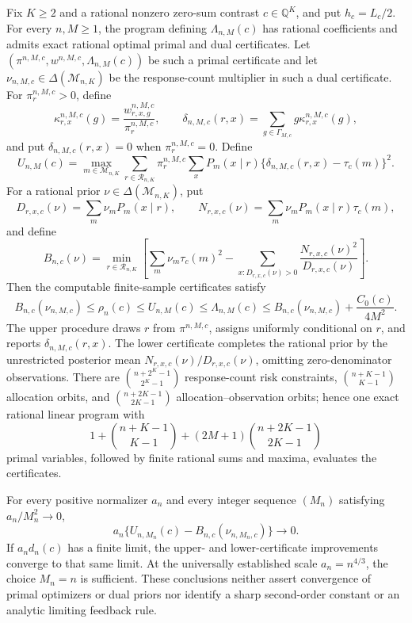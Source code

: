 Fix \(K\geq2\) and a rational nonzero zero-sum contrast \(c\in\mathbb Q^K\), and put \(h_c=L_c/2\).  For every \(n,M\geq1\), the program defining \(\Lambda_{n,M}(c)\) has rational coefficients and admits exact rational optimal primal and dual certificates.  Let \((\pi^{n,M,c},w^{n,M,c},\Lambda_{n,M}(c))\) be such a primal certificate and let \(\nu_{n,M,c}\in\Delta(\mathcal M_{n,K})\) be the response-count multiplier in such a dual certificate.  For \(\pi_r^{n,M,c}>0\), define
\[
 \kappa_{r,x}^{n,M,c}(g)=\frac{w_{r,x,g}^{n,M,c}}{\pi_r^{n,M,c}},
 \qquad
 \delta_{n,M,c}(r,x)=\sum_{g\in\Gamma_{M,c}}g\kappa_{r,x}^{n,M,c}(g),
\]
and put \(\delta_{n,M,c}(r,x)=0\) when \(\pi_r^{n,M,c}=0\).  Define
\[
 U_{n,M}(c)=\max_{m\in\mathcal M_{n,K}}
 \sum_{r\in\mathcal R_{n,K}}\pi_r^{n,M,c}\sum_xP_m(x\mid r)
 \{\delta_{n,M,c}(r,x)-\tau_c(m)\}^2.
\]
For a rational prior \(\nu\in\Delta(\mathcal M_{n,K})\), put
\[
 D_{r,x,c}(\nu)=\sum_m\nu_mP_m(x\mid r),
 \qquad
 N_{r,x,c}(\nu)=\sum_m\nu_mP_m(x\mid r)\tau_c(m),
\]
and define
\[
 B_{n,c}(\nu)=\min_{r\in\mathcal R_{n,K}}
 \left[
 \sum_m\nu_m\tau_c(m)^2-
 \sum_{x:D_{r,x,c}(\nu)>0}
 \frac{N_{r,x,c}(\nu)^2}{D_{r,x,c}(\nu)}
 \right].
\]
Then the computable finite-sample certificates satisfy
\[
 B_{n,c}(\nu_{n,M,c})\leq\rho_n(c)\leq U_{n,M}(c)
 \leq\Lambda_{n,M}(c)
 \leq B_{n,c}(\nu_{n,M,c})+\frac{C_0(c)}{4M^2}.
\]
The upper procedure draws \(r\) from \(\pi^{n,M,c}\), assigns uniformly conditional on \(r\), and reports \(\delta_{n,M,c}(r,x)\).  The lower certificate completes the rational prior by the unrestricted posterior mean \(N_{r,x,c}(\nu)/D_{r,x,c}(\nu)\), omitting zero-denominator observations.  There are \(\binom{n+2^K-1}{2^K-1}\) response-count risk constraints, \(\binom{n+K-1}{K-1}\) allocation orbits, and \(\binom{n+2K-1}{2K-1}\) allocation--observation orbits; hence one exact rational linear program with
\[
 1+\binom{n+K-1}{K-1}
 +(2M+1)\binom{n+2K-1}{2K-1}
\]
primal variables, followed by finite rational sums and maxima, evaluates the certificates.

For every positive normalizer \(a_n\) and every integer sequence \((M_n)\) satisfying \(a_n/M_n^2\to0\),
\[
 a_n\{U_{n,M_n}(c)-B_{n,c}(\nu_{n,M_n,c})\}\longrightarrow0.
\]
If \(a_nd_n(c)\) has a finite limit, the upper- and lower-certificate improvements converge to that same limit.  At the universally established scale \(a_n=n^{4/3}\), the choice \(M_n=n\) is sufficient.  These conclusions neither assert convergence of primal optimizers or dual priors nor identify a sharp second-order constant or an analytic limiting feedback rule.